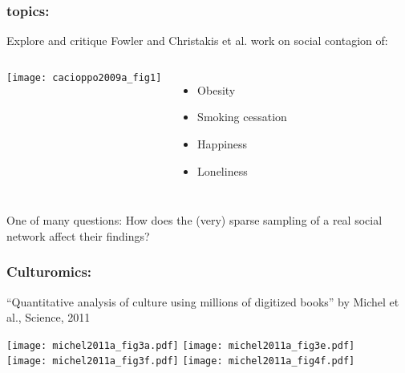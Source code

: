 \begin{frame}
  \frametitle{topics:}

  \begin{block}{Explore and critique Fowler and Christakis et al. work on
      social contagion of:}
    \begin{columns}
      \texttt{[image: cacioppo2009a\_fig1]}
      \begin{itemize}
      \item 
        Obesity\cite{christakis2007a}
      \item
        Smoking cessation\cite{christakis2008a}
      \item
        Happiness\cite{fowler2008a}
      \item
        Loneliness\cite{cacioppo2009a}
      \end{itemize}
    \end{columns}
  \end{block}

  \begin{block}{One of many questions:}
    How does the (very) sparse sampling
    of a real social network affect their findings?
  \end{block}

\end{frame}


\begin{frame}
  \frametitle{Culturomics:}

  \small{``Quantitative analysis of culture using millions of
    digitized books'' by Michel et al., Science, 2011\cite{michel2011a}}

  \texttt{[image: michel2011a\_fig3a.pdf]} 
  \texttt{[image: michel2011a\_fig3e.pdf]} \\
  \texttt{[image: michel2011a\_fig3f.pdf]}
  \texttt{[image: michel2011a\_fig4f.pdf]}

  {\small
    \\
  }

\end{frame}


